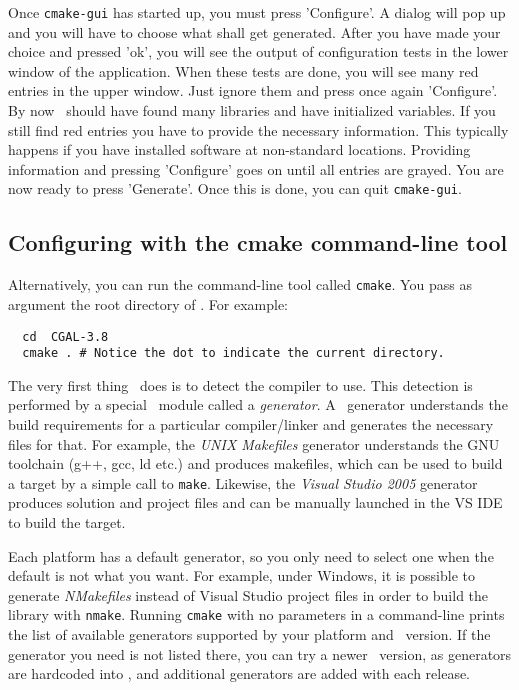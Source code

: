 Once \texttt{cmake-gui} has started up, you must press 'Configure'. 
A dialog will pop up and you will have to choose what shall get generated.
After you have made your choice and pressed 'ok', you will see
the output of configuration tests in the lower window of the application. 
When these tests are done, you will see many
red entries in the upper window. Just ignore them and  press once again  'Configure'. 
By now \cmake\ should have found many libraries and have initialized variables. 
If you still find red entries you have to provide the necessary information. 
This typically happens if you have installed software at non-standard locations.
Providing information and pressing 'Configure' goes on until 
all entries are grayed. You are now ready to press 'Generate'. Once this is
done, you can quit \texttt{cmake-gui}.

 

\subsection{Configuring \cgal{} with the cmake command-line tool }

Alternatively, you can run the command-line tool called
\texttt{cmake}. You pass as argument the root directory of
\cgal. For example:

{\ccTexHtml{\scriptsize}{}
\begin{verbatim}
  cd  CGAL-3.8
  cmake . # Notice the dot to indicate the current directory.
\end{verbatim}
}


The very first thing \cmake\ does is to detect the compiler to use.  This
detection is performed by a special \cmake\ module called a {\em
  generator}. A \cmake\ generator understands the build requirements for a
particular compiler/linker and generates the necessary files for that. For
example, the {\em UNIX Makefiles} generator understands the GNU toolchain
(g++, gcc, ld etc.) and produces makefiles, which can be used to build a
target by a simple call to \texttt{make}.  Likewise, the {\em Visual Studio
  2005} generator produces solution and project files and can be manually
launched in the VS IDE to build the target.

Each platform has a default generator, so you only need to select one when
the default is not what you want.  For example, under Windows, it is
possible to generate {\em NMakefiles} instead of Visual Studio project
files in order to build the library with \texttt{nmake}.  Running
\texttt{cmake} with no parameters in a command-line prints the list of
available generators supported by your platform and \cmake\ version. If the
generator you need is not listed there, you can try a newer \cmake\
version, as generators are hardcoded into \cmake, and additional
generators are added with each release.

